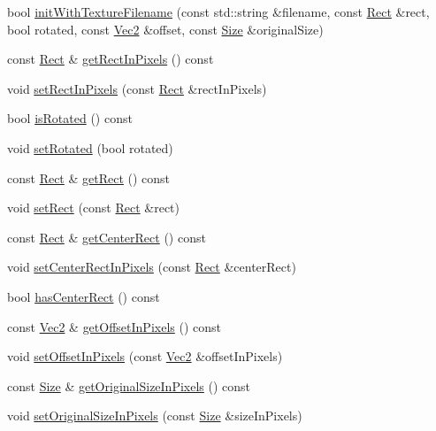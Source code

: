 \begin{DoxyCompactItemize}
\item 
bool \hyperlink{classSpriteFrame_ad1b6afd243eadab8a2f2128561645133}{init\+With\+Texture\+Filename} (const std\+::string \&filename, const \hyperlink{classRect}{Rect} \&rect, bool rotated, const \hyperlink{classVec2}{Vec2} \&offset, const \hyperlink{classSize}{Size} \&original\+Size)
\item 
const \hyperlink{classRect}{Rect} \& \hyperlink{classSpriteFrame_a4fe04d5adcc732b7f8f772f3020a2af5}{get\+Rect\+In\+Pixels} () const
\item 
void \hyperlink{classSpriteFrame_a7807d131620f961dd2ebc379c856f132}{set\+Rect\+In\+Pixels} (const \hyperlink{classRect}{Rect} \&rect\+In\+Pixels)
\item 
bool \hyperlink{classSpriteFrame_adefd8284eab4b8582aef36e339ee4f29}{is\+Rotated} () const
\item 
void \hyperlink{classSpriteFrame_ac047765c8364710cf04c99e9b723c84c}{set\+Rotated} (bool rotated)
\item 
const \hyperlink{classRect}{Rect} \& \hyperlink{classSpriteFrame_a7caab90d4ee888a3260f36c52146ca6d}{get\+Rect} () const
\item 
void \hyperlink{classSpriteFrame_a97b4f437895f61f48aa6462930a5c298}{set\+Rect} (const \hyperlink{classRect}{Rect} \&rect)
\item 
const \hyperlink{classRect}{Rect} \& \hyperlink{classSpriteFrame_a44d76b70a07458fd0e0917182f9feca7}{get\+Center\+Rect} () const
\item 
void \hyperlink{classSpriteFrame_a5f99a427f7b85cdd513ac79d9ae27784}{set\+Center\+Rect\+In\+Pixels} (const \hyperlink{classRect}{Rect} \&center\+Rect)
\item 
bool \hyperlink{classSpriteFrame_ad40e09d55cdcb74feb1f8941642c08bf}{has\+Center\+Rect} () const
\item 
const \hyperlink{classVec2}{Vec2} \& \hyperlink{classSpriteFrame_aea3d0cacb447d45c0c2d8cfb99a74b37}{get\+Offset\+In\+Pixels} () const
\item 
void \hyperlink{classSpriteFrame_a4429cffc4fd0910e0d80b456a319162b}{set\+Offset\+In\+Pixels} (const \hyperlink{classVec2}{Vec2} \&offset\+In\+Pixels)
\item 
const \hyperlink{classSize}{Size} \& \hyperlink{classSpriteFrame_ad1dd3ee536ab1374f915713fe9520673}{get\+Original\+Size\+In\+Pixels} () const
\item 
void \hyperlink{classSpriteFrame_ae9686ba8c8e9353f9bed4644e2c7d7e6}{set\+Original\+Size\+In\+Pixels} (const \hyperlink{classSize}{Size} \&size\+In\+Pixels)

\end{DoxyCompactItemize}
